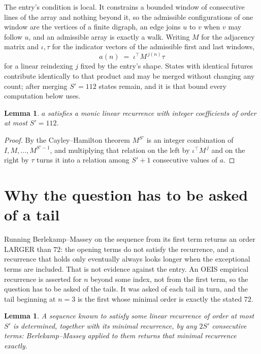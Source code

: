 \documentclass[11pt,a4paper]{article}
\theoremstyle{plain}
\newtheorem{lemma}[theorem]{Lemma}
\theoremstyle{definition}
\begin{document}
The entry's condition is local. It constrains a bounded window of consecutive lines of the
array and nothing beyond it, so the admissible configurations of one window are the vertices of
a finite digraph, an edge joins $u$ to $v$ when $v$ may follow $u$, and an admissible array is
exactly a walk. Writing $M$ for the adjacency matrix and $\iota,\tau$ for the indicator vectors
of the admissible first and last windows,
\[
a(n)\;=\;\iota^{\!\top}M^{\,j(n)}\tau
\]
for a linear reindexing $j$ fixed by the entry's shape. States with identical futures
contribute identically to that product and may be merged without changing any count; after
merging $S'=112$ states remain, and it is that bound every computation below uses.

\begin{lemma}\label{lem:cf}
$a$ satisfies a monic linear recurrence with integer coefficients of order at most $S'=112$.
\end{lemma}

\begin{proof}
By the Cayley--Hamilton theorem $M^{S'}$ is an integer combination of $I,M,\dots,M^{S'-1}$,
and multiplying that relation on the left by $\iota^{\!\top}M^{\,j}$ and on the right by
$\tau$ turns it into a relation among $S'+1$ consecutive values of $a$.
\end{proof}

\section{Why the question has to be asked of a tail}

Running Berlekamp--Massey on the sequence from its first term returns an order LARGER than $72$: the opening terms do not satisfy the recurrence, and a recurrence that holds only eventually always looks longer when the exceptional terms are included. That is not evidence against the entry. An OEIS empirical recurrence is asserted for $n$ beyond some index, not from the first term, so the question has to be asked of the tails. It was asked of each tail in turn, and the tail beginning at $n=3$ is the first whose minimal order is exactly the stated $72$.

\begin{lemma}\label{lem:bm}
A sequence known to satisfy some linear recurrence of order at most $S'$ is determined,
together with its minimal recurrence, by any $2S'$ consecutive terms: Berlekamp--Massey applied
to them returns that minimal recurrence exactly.
\end{lemma}
\end{document}
